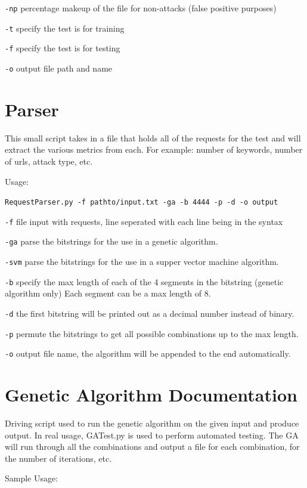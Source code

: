 \begin{appendices}
\texttt{-np} percentage makeup of the file for non-attacks (false
positive purposes)

\texttt{-t} specify the test is for training

\texttt{-f} specify the test is for testing

\texttt{-o} output file path and name

\section{Parser}  \label{app:parserDocumentation}

This small script takes in a file that holds all of the requests for the
test and will extract the various metrics from each. For example: number
of keywords, number of urls, attack type, etc.

Usage:

\texttt{RequestParser.py\ -f\ pathto/input.txt\ -ga\ -b\ 4444\ -p\ -d\ -o\ output}

\texttt{-f} file input with requests, line seperated with each line
being in the syntax

\texttt{-ga} parse the bitstrings for the use in a genetic algorithm.

\texttt{-svm} parse the bitstrings for the use in a supper vector
machine algorithm.

\texttt{-b} specify the max length of each of the 4 segments in the
bitstring (genetic algorithm only) Each segment can be a max length of
8.

\texttt{-d} the first bitstring will be printed out as a decimal number
instead of binary.

\texttt{-p} permute the bitstrings to get all possible combinations up
to the max length.

\texttt{-o} output file name, the algorithm will be appended to the end
automatically.

\section{Genetic Algorithm Documentation} \label{app:geneticDocumentation}

Driving script used to run the genetic algorithm on the given input and
produce output. In real usage, GATest.py is used to perform automated
testing. The GA will run through all the combinations and output a file
for each combination, for the number of iterations, etc.

Sample Usage:


\end{appendices}
